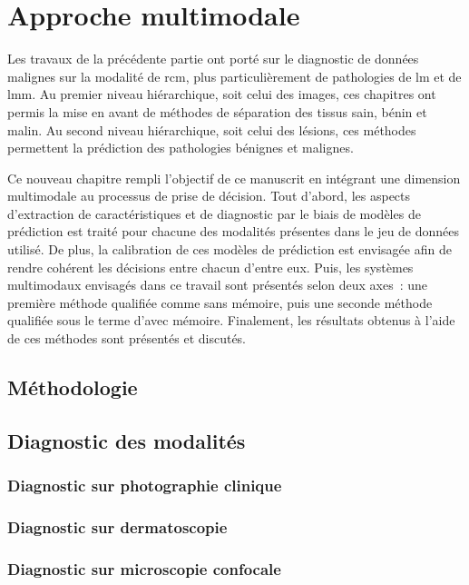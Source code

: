 \renewcommand{\thechapter}{\arabic{chapter}}
\setcounter{chapter}{8}

\chapter{Approche multimodale}
\label{chap:chapter_8}
\chapterintro
Les travaux de la précédente partie ont porté sur le diagnostic de données malignes sur la modalité de \acrlong{rcm}, plus particulièrement de pathologies de \acrlong{lm} et de \acrlong{lmm}. Au premier niveau hiérarchique, soit celui des images, ces chapitres ont permis la mise en avant de méthodes de séparation des tissus sain, bénin et malin. Au second niveau hiérarchique, soit celui des lésions, ces méthodes permettent la prédiction des pathologies bénignes et malignes.\par

Ce nouveau chapitre rempli l'objectif de ce manuscrit en intégrant une dimension multimodale au processus de prise de décision. Tout d'abord, les aspects d'extraction de caractéristiques et de diagnostic par le biais de modèles de prédiction est traité pour chacune des modalités présentes dans le jeu de données utilisé. De plus, la calibration de ces modèles de prédiction est envisagée afin de rendre cohérent les décisions entre chacun d’entre eux. Puis, les systèmes multimodaux envisagés dans ce travail sont présentés selon deux axes~: une première méthode qualifiée comme sans mémoire, puis une seconde méthode qualifiée sous le terme d’avec mémoire. Finalement, les résultats obtenus à l'aide de ces méthodes sont présentés et discutés.\par
\newpage

\section{Méthodologie}
\section{Diagnostic des modalités}
\subsection{Diagnostic sur photographie clinique}
\subsection{Diagnostic sur dermatoscopie}
\subsection{Diagnostic sur microscopie confocale}
\clearpage

